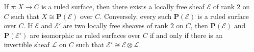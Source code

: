 If $\pi: X \rightarrow C$ is a ruled surface, then there exists a locally free sheaf $\mathcal{E}$ of rank $2$ on $C$ such that $X \cong \mathbf{P}(\mathcal{E})$ over $C$. Conversely, every such $\mathbf{P}(\mathcal{E})$ is a ruled surface over $C$. If $\mathcal{E}$ and $\mathcal{E}'$ are two locally free sheaves of rank $2$ on $C$, then $\mathbf{P}(\mathcal{E})$ and $\mathbf{P}(\mathcal{E}')$ are isomorphic as ruled surfaces over $C$ if and only if there is an invertible sheaf $\mathcal{L}$ on $C$ such that $\mathcal{E}' \cong \mathcal{E} \otimes \mathcal{L}$.
